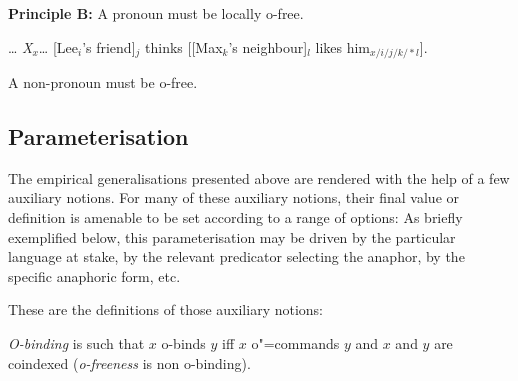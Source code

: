 \documentclass[output=paper
,modfonts
,nonflat]{langsci/langscibook}
\begin{document}
\begin{exe}
\sn
{\textbf{Principle B:}} A pronoun must be locally o-free.

\sn
{\ldots{} \emph{X}$_{x}$\ldots{} [Lee$_{i}$'s friend]$_{j}$ thinks [[Max$_{k}$'s neighbour]$_{l}$
likes \linebreak
 him$_{x/i/j/k/*l}$].}
\end{exe}



\begin{exe}
 A non-pronoun must be o-free.

\end{exe}
\vspace{4 mm}


\subsection{Parameterisation}\label{parameterisation}

The empirical generalisations presented above are rendered with the help of a few auxiliary
notions. For many of these auxiliary notions, their final value or definition is amenable to be
set according to a range of options: As briefly exemplified below, this parameterisation may be
driven by the particular language at stake, by the relevant predicator
selecting the anaphor, by the specific anaphoric form, etc.

These are the definitions of those auxiliary notions:

\emph{O-binding} is such that $x$ o-binds $y$ iff $x$ o"=commands $y$ 
and $x$ and $y$ are coindexed (\emph{o-freeness} is non o-binding).
\end{document}
